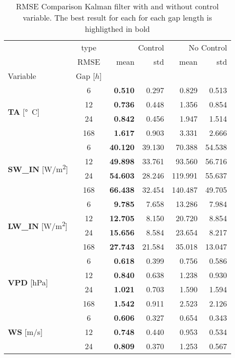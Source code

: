 \begin{table}
\centering
\caption{RMSE Comparison Kalman filter with and without control variable. The best result for each for each gap length is highligthed in bold}
\label{control}
\begin{tabular}{p{2.1cm}c|rr|rr}
\toprule
 & type & \multicolumn{2}{r}{Control} & \multicolumn{2}{r}{No Control} \\
 & RMSE & mean & std & mean & std \\
Variable & Gap [$h$] &  &  &  &  \\
\midrule
\multirow[c]{4}{*}{\parbox{2.1cm}{\textbf{TA} [\si{°C}]}} & 6 & \bfseries 0.510 & 0.297 & 0.829 & 0.513 \\
 & 12 & \bfseries 0.736 & 0.448 & 1.356 & 0.854 \\
 & 24 & \bfseries 0.842 & 0.456 & 1.947 & 1.514 \\
 & 168 & \bfseries 1.617 & 0.903 & 3.331 & 2.666 \\
\cline{1-6}
\multirow[c]{4}{*}{\parbox{2.1cm}{\textbf{SW\_IN} [\si{W/m^2}]}} & 6 & \bfseries 40.120 & 39.130 & 70.388 & 54.538 \\
 & 12 & \bfseries 49.898 & 33.761 & 93.560 & 56.716 \\
 & 24 & \bfseries 54.603 & 28.246 & 119.991 & 55.637 \\
 & 168 & \bfseries 66.438 & 32.454 & 140.487 & 49.705 \\
\cline{1-6}
\multirow[c]{4}{*}{\parbox{2.1cm}{\textbf{LW\_IN} [\si{W/m^2}]}} & 6 & \bfseries 9.785 & 7.658 & 13.286 & 7.984 \\
 & 12 & \bfseries 12.705 & 8.150 & 20.720 & 8.854 \\
 & 24 & \bfseries 15.656 & 8.584 & 23.654 & 8.217 \\
 & 168 & \bfseries 27.743 & 21.584 & 35.018 & 13.047 \\
\cline{1-6}
\multirow[c]{4}{*}{\parbox{2.1cm}{\textbf{VPD} [\si{hPa}]}} & 6 & \bfseries 0.618 & 0.399 & 0.756 & 0.586 \\
 & 12 & \bfseries 0.840 & 0.638 & 1.238 & 0.930 \\
 & 24 & \bfseries 1.021 & 0.703 & 1.590 & 1.594 \\
 & 168 & \bfseries 1.542 & 0.911 & 2.523 & 2.126 \\
\cline{1-6}
\multirow[c]{4}{*}{\parbox{2.1cm}{\textbf{WS} [\si{m/s}]}} & 6 & \bfseries 0.606 & 0.327 & 0.654 & 0.343 \\
 & 12 & \bfseries 0.748 & 0.440 & 0.953 & 0.534 \\
 & 24 & \bfseries 0.809 & 0.370 & 1.253 & 0.567 \\

\end{tabular}
\end{table}
